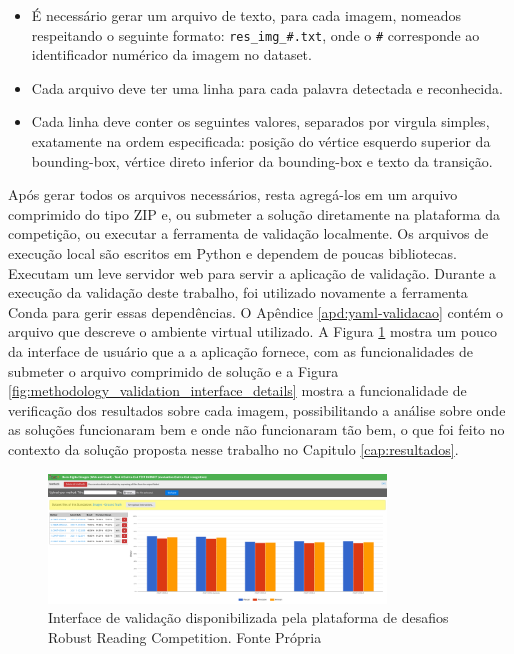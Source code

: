\begin{itemize}
    \item É necessário gerar um arquivo de texto, para cada imagem, nomeados respeitando o seguinte formato: \texttt{res\_img\_\#.txt}, onde o \texttt{\#} corresponde ao identificador numérico da imagem no dataset.
    \item Cada arquivo deve ter uma linha para cada palavra detectada e reconhecida.
    \item Cada linha deve conter os seguintes valores, separados por virgula simples, exatamente na ordem especificada: posição do vértice esquerdo superior da bounding-box, vértice direto inferior da bounding-box e texto da transição.
\end{itemize}

Após gerar todos os arquivos necessários, resta agregá-los em um arquivo comprimido do tipo ZIP e, ou submeter a solução diretamente na plataforma da competição, ou executar a ferramenta de validação localmente. Os arquivos de execução local são escritos em Python e dependem de poucas bibliotecas. Executam um leve servidor web para servir a aplicação de validação. Durante a execução da validação deste trabalho, foi utilizado novamente a ferramenta Conda para gerir essas dependências. O Apêndice \ref{apd:yaml-validacao} contém o arquivo que descreve o ambiente virtual utilizado. A Figura \ref{fig:methodology_validation_interface} mostra um pouco da interface de usuário que a a aplicação fornece, com as funcionalidades de submeter o arquivo comprimido de solução e a Figura \ref{fig:methodology_validation_interface_details} mostra a funcionalidade de verificação dos resultados sobre cada imagem, possibilitando a análise sobre onde as soluções funcionaram bem e onde não funcionaram tão bem, o que foi feito no contexto da solução proposta nesse trabalho no Capitulo \ref{cap:resultados}.

\begin{figure}
    \centering
    \includegraphics[width=0.8\textwidth]{figs/metodologia-interface-validacao.png}
    \caption{Interface de validação disponibilizada pela plataforma de desafios Robust Reading Competition. Fonte Própria}
    \label{fig:methodology_validation_interface}
\end{figure}

